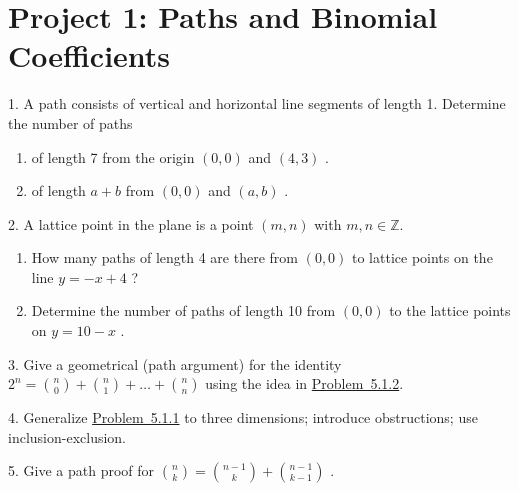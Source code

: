 \documentclass[10pt,]{book}
\theoremstyle{plain}
\theoremstyle{definition}
\theoremstyle{definition}
\numberwithin{equation}{chapter}
\def\Z{\mathbb Z}
\begin{document}
\section[{Project 1: Paths and Binomial Coefficients}]{Project 1: Paths and Binomial Coefficients}\label{exercises-5}
\begin{exerciselist}
\item[1.]\hypertarget{ex-count-paths}{}\hypertarget{p-180}{}%
A path consists of vertical and horizontal line segments of length 1. Determine the number of paths \leavevmode%
\begin{enumerate}[label=(\alph*)]
\item\hypertarget{li-45}{}\hypertarget{p-181}{}%
of length 7 from the origin \(\left( 0,0 \right)\) and \((4,3)\) .%
\item\hypertarget{li-46}{}\hypertarget{p-182}{}%
of length \(a + b\) from \(\left( 0,0 \right)\) and \((a,b)\) .%
\end{enumerate}
%
\par\smallskip
\item[2.]\hypertarget{ex-paths-on-lines}{}\hypertarget{p-183}{}%
A lattice point in the plane is a point \((m,n)\) with \(m,n \in \Z\). \leavevmode%
\begin{enumerate}[label=(\alph*)]
\item\hypertarget{li-47}{}\hypertarget{p-184}{}%
How many paths of length 4 are there from \((0,0)\) to lattice points on the line \(y = - x + 4\) ?%
\item\hypertarget{li-48}{}\hypertarget{p-185}{}%
Determine the number of paths of length 10 from \((0,0)\) to the lattice points on \(y = 10 - x\) .%
\end{enumerate}
%
\par\smallskip
\item[3.]\hypertarget{exercise-67}{}\hypertarget{p-186}{}%
Give a geometrical (path argument) for the identity \(2^{n} =
\binom{n}{0}
+
\binom{n}{1}
+ \ldots +
\binom{n}{n}\) using the idea in \hyperlink{ex-paths-on-lines}{Problem~5.1.2}.%
\par\smallskip
\item[4.]\hypertarget{exercise-68}{}\hypertarget{p-187}{}%
Generalize \hyperlink{ex-count-paths}{Problem~5.1.1} to three dimensions; introduce obstructions; use inclusion-exclusion.%
\par\smallskip
\item[5.]\hypertarget{exercise-69}{}\hypertarget{p-188}{}%
Give a path proof for \(\binom{n}{k}
=
\binom{n - 1}{k}
+
\binom{n - 1}{k - 1}\) .%

\end{exerciselist}
\end{document}

